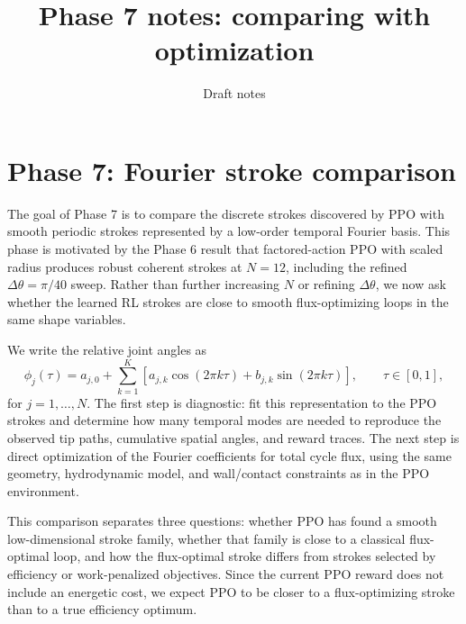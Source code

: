 \documentclass[11pt]{article}
\title{Phase 7 notes: comparing with optimization}
\author{}
\date{Draft notes}
\begin{document}
\maketitle


\section{Phase 7: Fourier stroke comparison}

The goal of Phase 7 is to compare the discrete strokes discovered by PPO with
smooth periodic strokes represented by a low-order temporal Fourier basis.  This
phase is motivated by the Phase 6 result that factored-action PPO with scaled
radius produces robust coherent strokes at \(N=12\), including the refined
\(\Delta\theta=\pi/40\) sweep.  Rather than further increasing \(N\) or refining
\(\Delta\theta\), we now ask whether the learned RL strokes are close to smooth
flux-optimizing loops in the same shape variables.

We write the relative joint angles as
\[
    \phi_j(\tau)
    =
    a_{j,0}
    +
    \sum_{k=1}^{K}
    \left[
        a_{j,k}\cos(2\pi k\tau)
        +
        b_{j,k}\sin(2\pi k\tau)
    \right],
    \qquad
    \tau\in[0,1],
\]
for \(j=1,\ldots,N\).  The first step is diagnostic: fit this representation to
the PPO strokes and determine how many temporal modes are needed to reproduce
the observed tip paths, cumulative spatial angles, and reward traces.  The next
step is direct optimization of the Fourier coefficients for total cycle flux,
using the same geometry, hydrodynamic model, and wall/contact constraints as in
the PPO environment.

This comparison separates three questions: whether PPO has found a smooth
low-dimensional stroke family, whether that family is close to a classical
flux-optimal loop, and how the flux-optimal stroke differs from strokes selected
by efficiency or work-penalized objectives.  Since the current PPO reward does
not include an energetic cost, we expect PPO to be closer to a flux-optimizing
stroke than to a true efficiency optimum.
\end{document}
